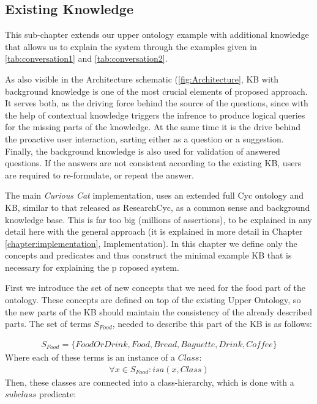 \subsection{Existing Knowledge}
\label{section:existingKB}
This sub-chapter extends our upper ontology example with additional knowledge
that allows us to explain the system through the examples given in 
\autoref{tab:conversation1} and \autoref{tab:conversation2}. 

As also visible in the Architecture schematic (\autoref{fig:Architecture},
KB with background knowledge is one of the most crucial elements of proposed 
approach. It serves both, as the driving force behind the source of the 
questions, since with the help of contextual knowledge triggers the infrence to
produce logical queries for the missing parts of the knowledge. At the same time
it is the drive behind the proactive user interaction, sarting either as a
question or a suggestion. Finally, the background knowledge is also used for 
validation of answered questions. If the answers are not consistent according
to the existing KB, users are required to re-formulate, or repeat the answer.

The main \emph{Curious Cat} implementation, uses an extended 
full Cyc ontology and KB, similar to that released as ResearchCyc, as a 
common sense and background knowledge base. This is far too big (millions of 
assertions), to be explained in any detail here with the general approach (it 
is explained in more detail in Chapter \ref{chapter:implementation}, 
Implementation). In this chapter we define only the concepts and predicates 
and thus construct the minimal example KB that is necessary for explaining the p
roposed system.

First we introduce the set of new concepts that we need for the food part
of the ontology. These concepts are defined on top of the existing Upper 
Ontology, so the new parts of the KB should maintain the consistency of the
already described parts. The set of terms $S_{Food} $, needed to describe this 
part of the KB is as follows:

\begin{equation}\label{set:foodTerms}
\begin{gathered}
S_{Food} = \{FoodOrDrink,Food,Bread,Baguette,Drink,Coffee\}
\end{gathered}
\end{equation}
Where each of these terms is an instance of a $Class$:
\begin{equation}\label{set:foodTermsClass}
\begin{gathered}
\forall x \in S_{Food}: isa(x,Class)
\end{gathered}
\end{equation}
Then, these classes are connected into a class-hierarchy, which is done with
a $subclass$ predicate:

